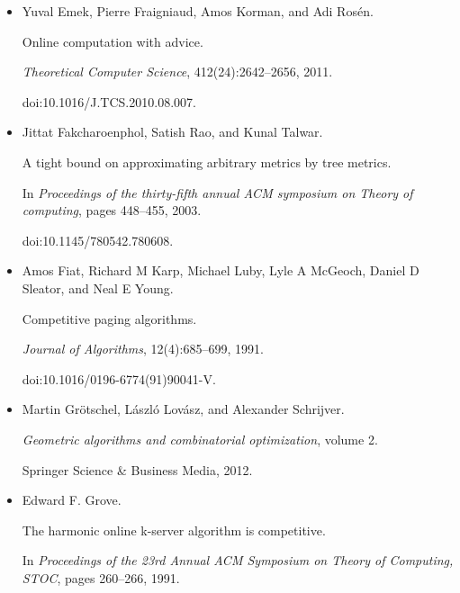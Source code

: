\documentclass[10pt,a4paper]{article}
\begin{document}
\begin{itemize}
doi:10.4230/LIPIcs.ICALP.2017.126.





\item[] 
[21]

Yuval Emek, Pierre Fraigniaud, Amos Korman, and Adi Rosén.


Online computation with advice.


\emph{Theoretical Computer Science}, 412(24):2642–2656, 2011.


doi:10.1016/J.TCS.2010.08.007.





\item[] 
[22]

Jittat Fakcharoenphol, Satish Rao, and Kunal Talwar.


A tight bound on approximating arbitrary metrics by tree metrics.


In \emph{Proceedings of the thirty-fifth annual ACM symposium on
Theory of computing}, pages 448–455, 2003.


doi:10.1145/780542.780608.





\item[] 
[23]

Amos Fiat, Richard M Karp, Michael Luby, Lyle A McGeoch, Daniel D Sleator, and
Neal E Young.


Competitive paging algorithms.


\emph{Journal of Algorithms}, 12(4):685–699, 1991.


doi:10.1016/0196-6774(91)90041-V.





\item[] 
[24]

Martin Grötschel, László Lovász, and Alexander Schrijver.


\emph{Geometric algorithms and combinatorial optimization}, volume 2.


Springer Science \& Business Media, 2012.





\item[] 
[25]

Edward F. Grove.


The harmonic online k-server algorithm is competitive.


In \emph{Proceedings of the 23rd Annual ACM Symposium on Theory of
Computing, STOC}, pages 260–266, 1991.



\end{itemize}
\end{document}
